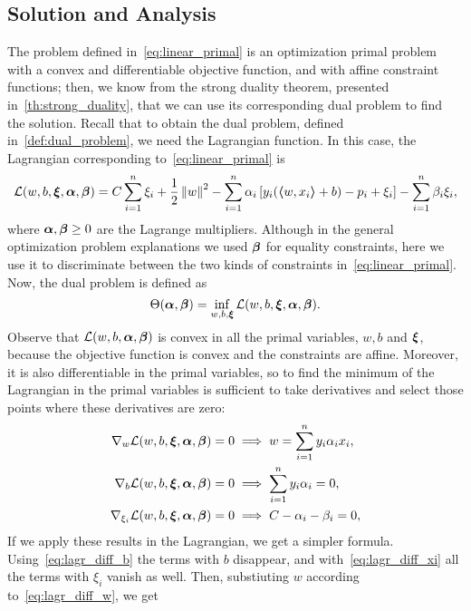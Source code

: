 \subsection{Solution and Analysis}
%
The problem defined in~\eqref{eq:linear_primal} is an optimization primal problem with a convex and differentiable objective function, and with affine constraint functions; then, we know from the strong duality theorem, presented in~\ref{th:strong_duality}, that we can use its corresponding dual problem to find the solution. Recall that to obtain the dual problem, defined in~\ref{def:dual_problem}, we need the Lagrangian function. In this case, the Lagrangian corresponding to~\ref{eq:linear_primal} is 
\begin{equation}
    \label{eq:linear_lagr}
    \lagr(w, b, \fv{\xi}, \fv{\alpha}, \fv{\beta}) = C \sum_{i=1}^\nsamples \xi_i + \frac{1}{2} \norm{w}^2 - \sum_{i=1}^\nsamples \alpha_i \left[ y_i (\dotp{w}{x_i} + b) - p_i + \xi_i \right] - \sum_{i=1}^\nsamples \beta_i \xi_i ,
\end{equation}
%
where $\bm{\alpha}, \bm{\beta} \geq 0$ are the Lagrange multipliers. Although in the general optimization problem explanations we used $\bm{\beta}$ for equality constraints, here we use it to discriminate between the two kinds of constraints in~\eqref{eq:linear_primal}. 
%
Now, the dual problem is defined as 
$$ \Theta(\bm{\alpha}, \bm{\beta}) = \inf_{w, b, \bm{\xi}} \mathcal{L}(w, b, \bm{\xi}, \bm{\alpha}, \bm{\beta}) . $$
Observe that $\mathcal{L}(w, b, \bm{\alpha}, \bm{\beta})$ is convex in all the primal variables, $w, b$ and $\bm{\xi}$, because the objective function is convex and the constraints are affine. Moreover, it is also differentiable in the primal variables, so to find the minimum of the Lagrangian in the primal variables is sufficient to take derivatives and select those points where these derivatives are zero:
\begin{align}
    \nabla_w \lagr(w, b, \fv{\xi}, \fv{\alpha}, \fv{\beta}) = 0 &\implies w = \sum_{i=1}^\nsamples y_i \alpha_i x_i , \label{eq:lagr_diff_w} \\
    \nabla_b \lagr(w, b, \fv{\xi}, \fv{\alpha}, \fv{\beta}) = 0 &\implies \sum_{i=1}^\nsamples y_i \alpha_i = 0, \label{eq:lagr_diff_b} \\
    \nabla_{\xi_i} \lagr(w, b, \fv{\xi}, \fv{\alpha}, \fv{\beta}) = 0 &\implies C - \alpha_i - \beta_i = 0 , \label{eq:lagr_diff_xi}
\end{align}
If we apply these results in the Lagrangian, we get a simpler formula. Using~\eqref{eq:lagr_diff_b} the terms with $b$ disappear, and with~\eqref{eq:lagr_diff_xi} all the terms with $\xi_i$ vanish as well. Then, substiuting $w$ according to~\eqref{eq:lagr_diff_w}, we get 
